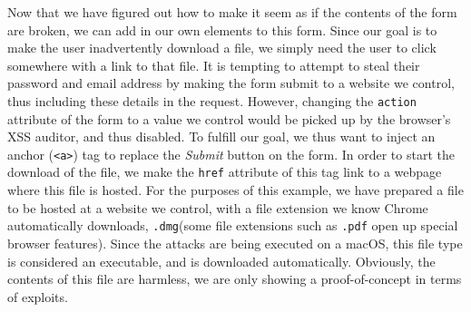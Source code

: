 Now that we have figured out how to make it seem as if the contents of the form are broken, we can add in our own elements to this form. Since our goal is to make the user inadvertently download a file, we simply need the user to click somewhere with a link to that file. It is tempting to attempt to steal their password and email address by making the form submit to a website we control, thus including these details in the request. However, changing the \texttt{action} attribute of the form to a value we control would be picked up by the browser's XSS auditor, and thus disabled. To fulfill our goal, we thus want to inject an anchor (\texttt{<a>}) tag to replace the \textit{Submit} button on the form. In order to start the download of the file, we make the \texttt{href} attribute of this tag link to a webpage where this file is hosted. For the purposes of this example, we have prepared a file to be hosted at a website we control, with a file extension we know Chrome automatically downloads, \texttt{.dmg}(some file extensions such as \texttt{.pdf} open up special browser features). Since the attacks are being executed on a macOS, this file type is considered an executable, and is downloaded automatically. Obviously, the contents of this file are harmless, we are only showing a proof-of-concept in terms of exploits. \\
























